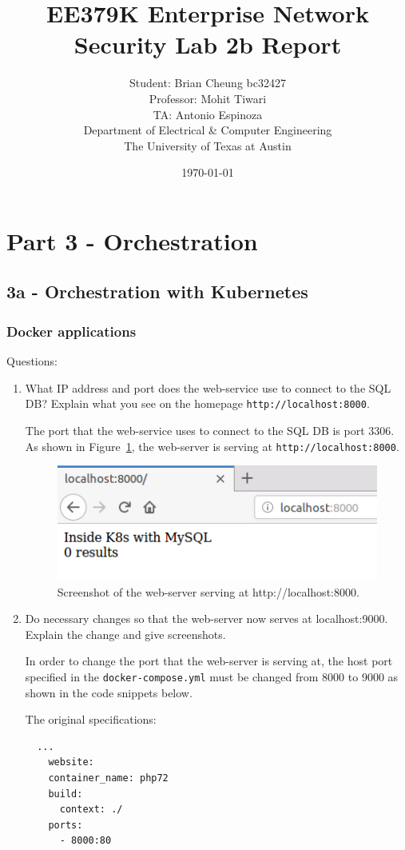 \documentclass[11pt]{article}
\author{Student: Brian Cheung bc32427 \\ Professor: Mohit Tiwari \\ TA: Antonio Espinoza \\ Department of Electrical \& Computer Engineering \\ The University of Texas at Austin}
\date{\today}
\title{EE379K Enterprise Network Security Lab 2b Report}
\begin{document}
\maketitle
\newpage
\section*{Part 3 - Orchestration}
\label{sec:part-1}
\subsection*{3a - Orchestration with Kubernetes}

\subsubsection*{Docker applications}
\noindent Questions:
\begin{enumerate}
  \item What IP address and port does the web-service use to connect to the SQL DB? Explain what you see on the homepage \verb|http://localhost:8000|.

  The port that the web-service uses to connect to the SQL DB is port 3306.
  As shown in Figure~\ref{fig:home-8000}, the web-server is serving at \verb|http://localhost:8000|.
  \begin{figure}[htbp]
    \centering
    \includegraphics[width=.9\linewidth]{./home-8000.png}
    \caption{\label{fig:home-8000}
    Screenshot of the web-server serving at http://localhost:8000.}
  \end{figure}

  \item Do necessary changes so that the web-server now serves at localhost:9000. Explain the change and give screenshots.

  In order to change the port that the web-server is serving at, the host port specified in the \verb|docker-compose.yml|
  must be changed from 8000 to 9000 as shown in the code snippets below.

  The original specifications:
  \begin{verbatim}
  ...
    website:
    container_name: php72
    build:
      context: ./
    ports:
      - 8000:80
  \end{verbatim}


\end{enumerate}
\end{document}
